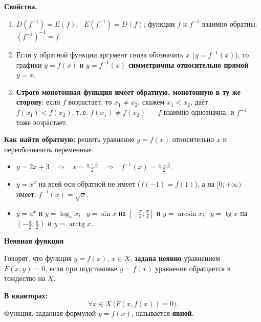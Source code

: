 \documentclass[a4paper,11pt]{article}
\DeclareMathOperator{\tg}{tg}
\DeclareMathOperator{\arctg}{arctg}
\newcommand{\kv}{\par\noindent\textbf{\textcolor{oprc!85!black}{В кванторах:}}}
\newcommand{\podr}[1]{\par\needspace{8\baselineskip}\medskip
  {\large\bfseries\textcolor{oprc!80!black}{#1}}\par\nopagebreak\smallskip}
\begin{document}
\textbf{Свойства.}
\begin{enumerate}[leftmargin=*]
  \item $D(f^{-1}) = E(f)$, \ $E(f^{-1}) = D(f)$; функции $f$ и $f^{-1}$ взаимно обратны: $(f^{-1})^{-1} = f$.
  \item Если у обратной функции аргумент снова обозначить $x$ ($y = f^{-1}(x)$), то графики $y = f(x)$ и $y = f^{-1}(x)$
        \textbf{симметричны относительно прямой $y = x$}.
  \item \textbf{Строго монотонная функция имеет обратную, монотонную в ту же сторону}: если $f$ возрастает, то
        $x_1 \ne x_2$, скажем $x_1 < x_2$, даёт $f(x_1) < f(x_2)$, т.\,е. $f(x_1) \ne f(x_2)$ --- $f$ взаимно однозначна;
        и $f^{-1}$ тоже возрастает.
\end{enumerate}

\textbf{Как найти обратную:} решить уравнение $y = f(x)$ относительно $x$ и переобозначить переменные.
\begin{itemize}[leftmargin=*]
  \item $y = 2x + 3$ \ $\Rightarrow$ \ $x = \frac{y - 3}{2}$ \ $\Rightarrow$ \ $f^{-1}(x) = \frac{x - 3}{2}$.
  \item $y = x^2$ на всей оси обратной не имеет ($f(-1) = f(1)$), а на $[0; +\infty)$ имеет: $f^{-1}(x) = \sqrt{x}$.
  \item $y = a^x$ и $y = \log_a x$; \ $y = \sin x$ на $\left[-\frac\pi2; \frac\pi2\right]$ и $y = \arcsin x$;
        \ $y = \tg x$ на $\left(-\frac\pi2; \frac\pi2\right)$ и $y = \arctg x$.
\end{itemize}

\begin{center}
\end{center}

\podr{Неявная функция}

\begin{opr}
Говорят, что функция $y = f(x)$, $x \in X$, \textbf{задана неявно} уравнением $F(x, y) = 0$, если при подстановке $y = f(x)$
уравнение обращается в тождество на $X$.
\kv
\[
  \forall x \in X\ \bigl( F(x, f(x)) = 0 \bigr).
\]
Функция, заданная формулой $y = f(x)$, называется \textbf{явной}.
\end{opr}
\end{document}
